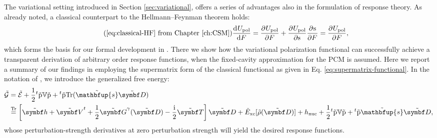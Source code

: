 The variational setting introduced in Section \ref{sec:variational},
offers a series of advantages also in the formulation of response
theory. As already noted, a classical counterpart to the
Hellmann--Feynman theorem holds:
\begin{equation}\tag{\ref{eq:classical-HF} from Chapter \ref{ch:CSM}}
  \deriv{U_\mathrm{pol}}{F} = \pderiv{U_\mathrm{pol}}{F}
  + \pderiv{U_\mathrm{pol}}{\s}\pderiv{\s}{F}
  = \pderiv{U_\mathrm{pol}}{F},
\end{equation}
which forms the basis for our formal development in
.\autocite{pcm-openrsp}
There we show how the variational polarization functional can
successfully achieve a transparent derivation of arbitrary order
response functions, when the fixed-cavity approximation for the
\acrshort*{PCM} is assumed.
Here we report a summary of our findings in  employing the
supermatrix form of the classical functional as given in Eq.
\eqref{eq:supermatrix-functional}.
In the notation of \citeauthor{Thorvaldsen2008-sg}, we introduce the
generalized free energy:
\begin{equation}\label{eq:generalized-KS-energy}
  \begin{aligned}
 \tilde{\mathcal{G}}
 &=
 \tilde{\mathcal{E}}
 + \frac{1}{2}{}^t\tilde{\p}\V\tilde{\p} +
 {}^t\tilde{\p}\Tr(\tilde{\mathbfup{s}}\pertmat{D}) \\
 &\eqtr
 \left[\pertmat{h} + \pertmat{V}^{t} +
 \frac{1}{2}\pertmat{G}^{\gamma}(\pertmat{D}) -
 \frac{\mathrm{i}}{2}\pertmat{T}\right]\pertmat{D}
 + \tilde{E}_\mathrm{xc}[\tilde{\rho}(\pertmat{D})] + h_\mathrm{nuc}
 + \frac{1}{2}{}^t\tilde{\p}\V\tilde{\p}
 + {}^t\tilde{\p}\tilde{\mathbfup{s}}\pertmat{D},
 \end{aligned}
\end{equation}
whose perturbation-strength derivatives at zero perturbation strength
will yield the desired response functions.


